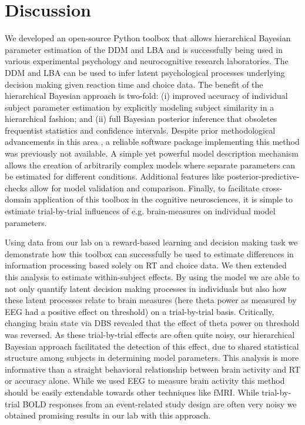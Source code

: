 \documentclass[letterpaper,10pt,english]{article}
\begin{document}
\section*{Discussion}
We developed an open-source Python toolbox that allows hierarchical Bayesian parameter estimation of the DDM and LBA and is successfully being used in various experimental psychology and neurocognitive research laboratories. The DDM and LBA can be used to infer latent psychological processes underlying decision making given reaction time and choice data. The benefit of the hierarchical Bayesian approach is two-fold: (i) improved accuracy of individual subject parameter estimation by explicitly modeling subject similarity in a hierarchical fashion; and (ii) full Bayesian posterior inference that obsoletes frequentist statistics and confidence intervals. Despite prior methodological advancements in this area \citep{VandekerckhoveTuerlinckxLee11}, a reliable software package implementing this method was previously not available. A simple yet powerful model description mechanism allows the creation of arbitrarily complex models where separate parameters can be estimated for different conditions. Additional features like posterior-predictive-checks allow for model validation and comparison. Finally, to facilitate cross-domain application of this toolbox in the cognitive neurosciences, it is simple to estimate trial-by-trial influences of e.g. brain-measures on individual model parameters.

Using data from our lab on a reward-based learning and decision making task \citep{CavanaghWieckiCohenEtAl11} we demonstrate how this toolbox can successfully be used to estimate differences in information processing based solely on RT and choice data. We then extended this analysis to estimate within-subject effects. By using the  model we are able to not only quantify latent decision making processes in individuals but also how these latent processes relate to brain measures (here theta power as measured by EEG had a positive effect on threshold) on a trial-by-trial basis. Critically, changing brain state via DBS revealed that the effect of theta power on threshold was reversed. As these trial-by-trial effects are often quite noisy, our hierarchical Bayesian approach facilitated the detection of this effect, due to shared statistical structure among subjects in determining model parameters. This analysis is more informative than a straight behavioral relationship between brain activity and RT or accuracy alone. While we used EEG to measure brain activity this method should be easily extendable towards other techniques like fMRI. While trial-by-trial BOLD responses from an event-related study design are often very noisy we obtained promising results in our lab with this approach.
\end{document}
